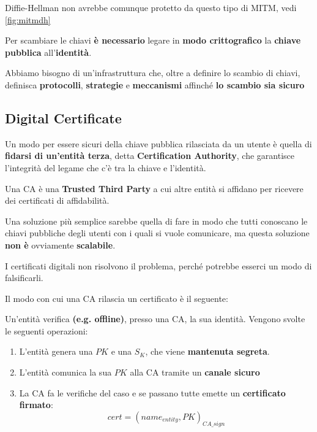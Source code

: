 \begin{remark}
Diffie-Hellman non avrebbe comunque protetto da questo tipo di MITM, vedi \cref{fig:mitmdh}
\end{remark}
\begin{proposition}
Per scambiare le chiavi \textbf{è necessario} legare in \textbf{modo crittografico} la \textbf{chiave pubblica} all'\textbf{identità}.
\end{proposition}
Abbiamo bisogno di un'infrastruttura che, oltre a definire lo scambio di chiavi, definisca \textbf{protocolli}, \textbf{strategie} e \textbf{meccanismi} affinché \textbf{lo scambio sia sicuro}\pagebreak
\subsection{Digital Certificate}\label{sssec:digitalcert}
Un modo per essere sicuri della chiave pubblica rilasciata da un utente è quella di \textbf{fidarsi di un'entità terza}, detta \textbf{Certification Authority}, che garantisce l'integrità del legame che c'è tra la chiave e l'identità.
\begin{definition}\label{def:ca}
Una CA è una \textbf{Trusted Third Party} a cui altre entità si affidano per ricevere dei certificati di affidabilità.
\end{definition}
\begin{remark}
Una soluzione più semplice sarebbe quella di fare in modo che tutti conoscano le chiavi pubbliche degli utenti con i quali si vuole comunicare, ma questa soluzione \textbf{non è} ovviamente \textbf{scalabile}.
\end{remark}
\begin{note}
I certificati digitali non risolvono il problema, perché potrebbe esserci un modo di falsificarli.
\end{note}
Il modo con cui una CA rilascia un certificato è il seguente:
\begin{proposition}
Un'entità verifica \textbf{(e.g. offline)}, presso una CA, la sua identità. Vengono svolte le seguenti operazioni:
\begin{enumerate}
    \item L'entità genera una $PK$ e una $S_K$, che viene \textbf{mantenuta segreta}.
    \item L'entità comunica la sua $PK$ alla CA tramite un \textbf{canale sicuro}
    \item La CA fa le verifiche del caso e se passano tutte emette un \textbf{certificato firmato}:
    \[cert=(name_{entity}, PK)_{CA\_sign}\]
\end{enumerate}
\end{proposition}
